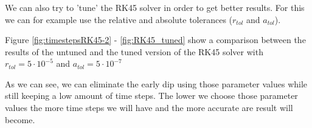 \documentclass{article}
\begin{document}
    \clearpage

    \subsubsection{}
    We can also try to 'tune' the RK45 solver in order to get better results. For this we can for example use the relative and absolute tolerances ($r_{tol}$ and $a_{tol}$).

    Figure \ref{fig:timestepsRK45-2} - \ref{fig:RK45_tuned} show a comparison between the results of the untuned and the tuned version of the RK45 solver with $r_{tol} = 5 \cdot 10^{-5}$ and $a_{tol} = 5 \cdot 10^{-7}$

    \vspace{10pt}
    As we can see, we can eliminate the early dip using those parameter values while still keeping a low amount of time steps. The lower we choose those parameter values the more time steps we will have and the more accurate are result will become.
\end{document}
